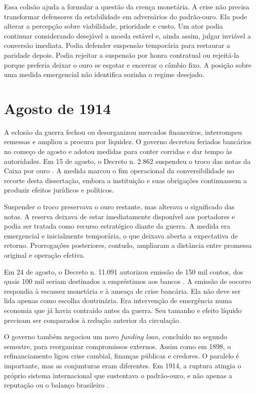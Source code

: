 Essa colisão ajuda a formular a questão da crença monetária. A crise não precisa transformar defensores da estabilidade em adversários do padrão-ouro. Ela pode alterar a percepção sobre viabilidade, prioridade e custo. Um ator podia continuar considerando desejável a moeda estável e, ainda assim, julgar inviável a conversão imediata. Podia defender suspensão temporária para restaurar a paridade depois. Podia rejeitar a suspensão por honra contratual ou rejeitá-la porque preferia deixar o ouro se esgotar e encerrar o câmbio fixo. A posição sobre uma medida emergencial não identifica sozinha o regime desejado.

\section{Agosto de 1914}

A eclosão da guerra fechou ou desorganizou mercados financeiros, interrompeu remessas e ampliou a procura por liquidez. O governo decretou feriados bancários no começo de agosto e adotou medidas para conter corridas e dar tempo às autoridades. Em 15 de agosto, o Decreto n. 2.862 suspendeu o troco das notas da Caixa por ouro \cite{brasil1914suspensao}. A medida marcou o fim operacional da conversibilidade no recorte desta dissertação, embora a instituição e suas obrigações continuassem a produzir efeitos jurídicos e políticos.

Suspender o troco preservava o ouro restante, mas alterava o significado das notas. A reserva deixava de estar imediatamente disponível aos portadores e podia ser tratada como recurso estratégico diante da guerra. A medida era emergencial e inicialmente temporária, o que deixava aberta a expectativa de retorno. Prorrogações posteriores, contudo, ampliaram a distância entre promessa original e operação efetiva.

Em 24 de agosto, o Decreto n. 11.091 autorizou emissão de 150 mil contos, dos quais 100 mil seriam destinados a empréstimos aos bancos \cite{brasil1914emissao}. A emissão de socorro respondia à escassez monetária e à ameaça de crise bancária. Ela não deve ser lida apenas como escolha doutrinária. Era intervenção de emergência numa economia que já havia contraído antes da guerra. Seu tamanho e efeito líquido precisam ser comparados à redução anterior da circulação.

O governo também negociou um novo \textit{funding loan}, concluído no segundo semestre, para reorganizar compromissos externos. Assim como em 1898, o refinanciamento ligou crise cambial, finanças públicas e credores. O paralelo é importante, mas as conjunturas eram diferentes. Em 1914, a ruptura atingia o próprio sistema internacional que sustentava o padrão-ouro, e não apenas a reputação ou o balanço brasileiro \cite{fritsch1990,francolago2011}.

